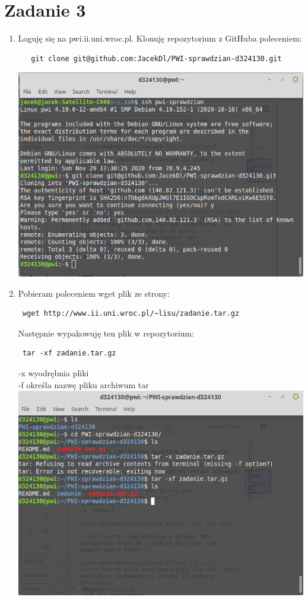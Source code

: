 \documentclass{article}
\begin{document}
 \section*{Zadanie 3}
 \begin{enumerate}
  \item Loguję się na pwi.ii.uni.wroc.pl. Klonuję repozytorium z GitHuba poleceniem:
  \begin{verbatim}
   git clone git@github.com:JacekDl/PWI-sprawdzian-d324130.git
  \end{verbatim}
\includegraphics[scale=0.4]{gitclone.png}
\item Pobieram poleceniem wget plik ze strony:
\begin{verbatim}
 wget http://www.ii.uni.wroc.pl/~lisu/zadanie.tar.gz
\end{verbatim}
Następnie wypakowuję ten plik w repozytorium:
\begin{verbatim}
 tar -xf zadanie.tar.gz
\end{verbatim}
-x wyodrębnia pliki\\
-f określa nazwę pliku archiwum tar\cite{tar}\\
\includegraphics[scale=0.4]{tar.png}\\

\end{enumerate}
\end{document}
